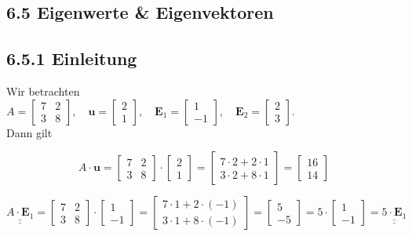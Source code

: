 \documentclass[10pt]{article}
\begin{document}
\subsection*{6.5 Eigenwerte \& Eigenvektoren}
\subsection*{6.5.1 Einleitung}
Wir betrachten\\
$A=\left[\begin{array}{ll}7 & 2 \\ 3 & 8\end{array}\right], \quad \mathbf{u}=\left[\begin{array}{l}2 \\ 1\end{array}\right], \quad \mathbf{E}_{1}=\left[\begin{array}{r}1 \\ -1\end{array}\right], \quad \mathbf{E}_{2}=\left[\begin{array}{l}2 \\ 3\end{array}\right]$.\\
Dann gilt

\[
A \cdot \mathbf{u}=\left[\begin{array}{ll}7 & 2  \tag{6.150}\\ 3 & 8\end{array}\right] \cdot\left[\begin{array}{l}2 \\ 1\end{array}\right]=\left[\begin{array}{c}7 \cdot 2+2 \cdot 1 \\ 3 \cdot 2+8 \cdot 1\end{array}\right]=\left[\begin{array}{l}16 \\ 14\end{array}\right]
\]

\[
\underline{\underline{A \cdot \mathbf{E}_{1}}}=\left[\begin{array}{ll}7 & 2  \tag{6.151}\\ 3 & 8\end{array}\right] \cdot\left[\begin{array}{r}1 \\ -1\end{array}\right]=\left[\begin{array}{l}7 \cdot 1+2 \cdot(-1) \\ 3 \cdot 1+8 \cdot(-1)\end{array}\right]=\left[\begin{array}{r}5 \\ -5\end{array}\right]=5 \cdot\left[\begin{array}{r}1 \\ -1\end{array}\right]=\underline{\underline{5 \cdot \mathbf{E}_{1}}}
\]
\end{document}
